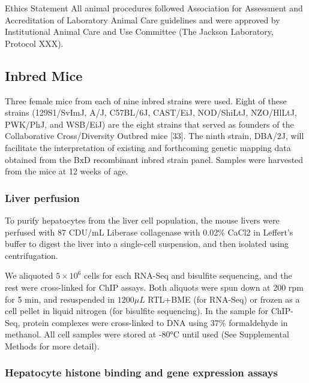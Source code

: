 \documentclass[10pt,letterpaper]{article}
\begin{document}
Ethics Statement All animal procedures followed Association for
Assessment and Accreditation of Laboratory Animal Care guidelines and
were approved by Institutional Animal Care and Use Committee (The
Jackson Laboratory, Protocol XXX).

\hypertarget{inbred-mice}{%
\subsection{Inbred Mice}\label{inbred-mice}}

Three female mice from each of nine inbred strains were used. Eight of
these strains (129S1/SvImJ, A/J, C57BL/6J, CAST/EiJ, NOD/ShiLtJ,
NZO/HlLtJ, PWK/PhJ, and WSB/EiJ) are the eight strains that served as
founders of the Collaborative Cross/Diversity Outbred mice {[}33{]}. The
ninth strain, DBA/2J, will facilitate the interpretation of existing and
forthcoming genetic mapping data obtained from the BxD recombinant
inbred strain panel. Samples were harvested from the mice at 12 weeks of
age.

\hypertarget{liver-perfusion}{%
\subsubsection{Liver perfusion}\label{liver-perfusion}}

To purify hepatocytes from the liver cell population, the mouse livers
were perfused with 87 CDU/mL Liberase collagenase with 0.02\% CaCl2 in
Leffert's buffer to digest the liver into a single-cell suspension, and
then isolated using centrifugation.

We aliquoted \(5 \times 10^{6}\) cells for each RNA-Seq and bisulfite
sequencing, and the rest were cross-linked for ChIP assays. Both
aliquots were spun down at 200 rpm for 5 min, and resuspended in
\(1200\mu L\) RTL+BME (for RNA-Seq) or frozen as a cell pellet in liquid
nitrogen (for bisulfite sequencing). In the sample for ChIP-Seq, protein
complexes were cross-linked to DNA using 37\% formaldehyde in methanol.
All cell samples were stored at -80°C until used (See Supplemental
Methods for more detail).

\hypertarget{hepatocyte-histone-binding-and-gene-expression-assays}{%
\subsubsection{Hepatocyte histone binding and gene expression
assays}\label{hepatocyte-histone-binding-and-gene-expression-assays}}
\end{document}

